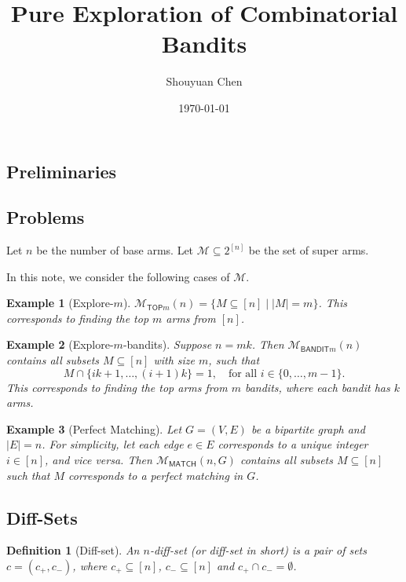 \documentclass{article}
\title{Pure Exploration of Combinatorial Bandits}
\author{Shouyuan Chen}
\date{\today}
\newtheorem{define}{Definition}
\newtheorem{example}{Example}
\newcommand{\M}{\mathcal M}
\newcommand{\mmatch}{\mathcal M_{\mathsf{MATCH}}}
\newcommand{\mtop}{\mathcal M_{\mathsf{TOP}m}}
\newcommand{\mbandit}{\mathcal M_{\mathsf{BANDIT}m}}
\begin{document}
\begin{spacing}{1.1}
\newpage

\maketitle

\section{Preliminaries}

\subsection{Problems}

Let $n$ be the number of base arms. 
Let $\M \subseteq 2^{[n]}$ be the set of super arms. 


In this note, we consider the following cases of $\M$.

\begin{example}[Explore-$m$]
$\mtop(n)=\{M \subseteq [n] \;|\; |M|=m\}$.
This corresponds to finding the top $m$ arms from $[n]$.
\end{example}

\begin{example}[Explore-$m$-bandits]
Suppose $n=mk$. Then $\mbandit(n)$ contains all subsets $M \subseteq [n]$ with size $m$, such that 
$$ 
M\cap \{ik+1,\ldots, (i+1)k\} = 1, \quad \text{for all } i \in \{0,\ldots, m-1\}.
$$ 
This corresponds to finding the top arms from $m$ bandits, where each bandit has $k$ arms.
\end{example}

\begin{example}[Perfect Matching]
Let $G=(V,E)$ be a bipartite graph and $|E|=n$. 
For simplicity, let each edge $e\in E$ corresponds to a unique integer $i\in [n]$, and vice versa. 
Then $\mmatch(n,G)$ contains all subsets $M \subseteq [n]$ such that $M$ corresponds to a perfect matching in $G$.
\end{example}


\subsection{Diff-Sets}

\begin{define}[Diff-set]
An $n$-diff-set (or diff-set in short) is a pair of sets $c=(c_+,c_-)$, where $c_+\subseteq[n]$, $c_-\subseteq [n]$ and $c_+\cap c_-=\emptyset$.
\end{define}



\end{spacing}
\end{document}
